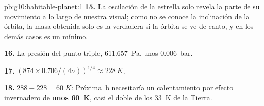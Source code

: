 \begin{solution}{pb:g10:habitable-planet:1}
\textbf{15.} La oscilación de la estrella solo revela la parte de su
movimiento a lo largo de nuestra visual; como no se conoce la inclinación de
la órbita, la masa obtenida solo es la verdadera si la órbita se ve de
canto, y en los demás casos es un mínimo.

\textbf{16.} La presión del punto triple, \qty{611.657}{Pa}, unos
\qty{0.006}{bar}.

\textbf{17.} $(874 \times 0.706/(4\sigma))^{1/4} \approx \qty{228}{K}$.

\textbf{18.} $288 - 228 = \qty{60}{K}$: Próxima~b necesitaría un
calentamiento por efecto invernadero de \textbf{unos \qty{60}{K}}, casi el
doble de los \qty{33}{K} de la Tierra.
\end{solution}

